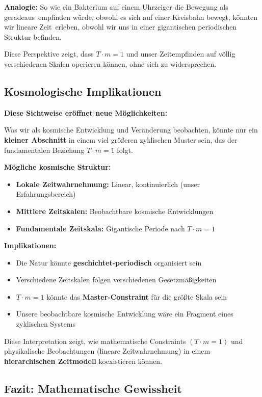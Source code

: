 \documentclass[12pt,a4paper]{article}
\theoremstyle{definition}
\theoremstyle{remark}
\begin{document}
\textbf{Analogie:} So wie ein Bakterium auf einem Uhrzeiger die Bewegung als \glqq geradeaus\grqq\ empfinden würde, obwohl es sich auf einer Kreisbahn bewegt, könnten wir \glqq lineare Zeit\grqq\ erleben, obwohl wir uns in einer gigantischen periodischen Struktur befinden.

Diese Perspektive zeigt, dass $T \cdot m = 1$ und unser Zeitempfinden auf völlig verschiedenen Skalen operieren können, ohne sich zu widersprechen.

\subsection{Kosmologische Implikationen}

\textbf{Diese Sichtweise eröffnet neue Möglichkeiten:}

Was wir als kosmische Entwicklung und Veränderung beobachten, könnte nur ein \textbf{kleiner Abschnitt} in einem viel größeren zyklischen Muster sein, das der fundamentalen Beziehung $T \cdot m = 1$ folgt.

\textbf{Mögliche kosmische Struktur:}
\begin{itemize}
	\item \textbf{Lokale Zeitwahrnehmung:} Linear, kontinuierlich (unser Erfahrungsbereich)
	\item \textbf{Mittlere Zeitskalen:} Beobachtbare kosmische Entwicklungen
	\item \textbf{Fundamentale Zeitskala:} Gigantische Periode nach $T \cdot m = 1$
\end{itemize}

\textbf{Implikationen:}
\begin{itemize}
	\item Die Natur könnte \textbf{geschichtet-periodisch} organisiert sein
	\item Verschiedene Zeitskalen folgen verschiedenen Gesetzmäßigkeiten
	\item $T \cdot m = 1$ könnte das \textbf{Master-Constraint} für die größte Skala sein
	\item Unsere beobachtbare kosmische Entwicklung wäre ein Fragment eines zyklischen Systems
\end{itemize}

Diese Interpretation zeigt, wie mathematische Constraints $(T \cdot m = 1)$ und physikalische Beobachtungen (lineare Zeitwahrnehmung) in einem \textbf{hierarchischen Zeitmodell} koexistieren können.

\subsection{Fazit: Mathematische Gewissheit}
\end{document}
